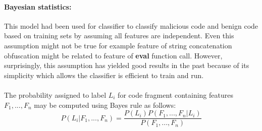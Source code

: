 \documentclass[11pt]{article}
\begin{document}
\paragraph{Bayesian statistics:} 
This model had been used for classifier to classify malicious code and benign code based on training sets by assuming all features are independent.  Even this assumption might not be true for example feature of string concatenation obfuscation might be related to feature of \textbf{eval} function call. However, surprisingly, this assumption has yielded good results in the past because of its simplicity which allows the classifier is efficient to train and run. \\ \\
The probability assigned to label $L_{i}$ for code fragment containing features $F_{1},...,F_{n}$ may be computed using Bayes rule as follows: \\
$$P(L_{i}|F_{1},...,F_{n})=\frac{P(L_{i})P(F_{1},...,F_{n}|L_{i})}{P(F_{1},...,F_{n})}$$
\phantom \\
\newpage
\end{document}
